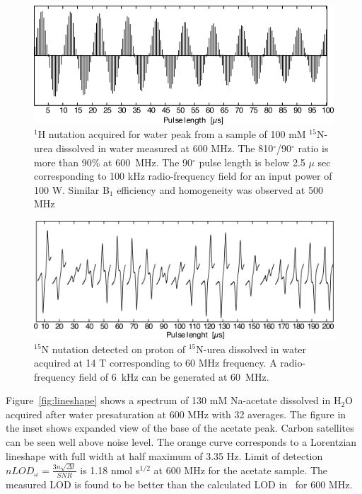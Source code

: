 \documentclass[preprint,12pt]{article}
\begin{document}
\begin{figure}
\centering
\includegraphics[width=.7\linewidth,keepaspectratio=true]{./figures/ms5n17-tlp-sp-150218-1-Hnutation-171216-103.png} 
\caption{$^1$H nutation acquired for water peak from a sample of 100 mM $^{15}$N-urea dissolved in water measured at 600 MHz. The 810$^{\circ}$/90$^{\circ}$ ratio is more than 90\% at 600~MHz. The 90$^{\circ}$ pulse length is below 2.5 $\mu$ sec corresponding to 100 kHz radio-frequency field for an input power of 100 W. Similar B$_{1}$ efficiency and homogeneity was observed at 500 MHz}
\label{fig:1H-nutation} 
\end{figure}
\begin{figure}
\centering
\includegraphics[width=.7\linewidth,keepaspectratio=true]{./figures/ms5n17-tlp-sp-150218-15-Nnutation-171215-003.png} 
\caption{$^{15}$N nutation detected on proton of $^{15}$N-urea dissolved in water acquired at 14 T corresponding to 60 MHz frequency. A radio-frequency field of 6~kHz can be generated at 60~MHz.}
\label{fig:15N-nutation} 
\end{figure}
Figure~\ref{fig:lineshape} shows a spectrum of 130 mM Na-acetate dissolved in H$_2$O acquired after water presaturation at 600 MHz with 32 averages. The figure in the inset shows expanded view of the base of the acetate peak. Carbon satellites can be seen well above noise level. The orange curve corresponds to a Lorentzian lineshape with full width at half maximum of 3.35 Hz. Limit of detection $nLOD_{\omega}=\frac{3n\sqrt{{\Delta}t}}{SNR}$ is  1.18 nmol s$^{1/2}$ at 600 MHz for the acetate sample. The measured LOD is found to be better than the calculated LOD in~\cite{gream_2016} for 600 MHz.\par
\end{document}
